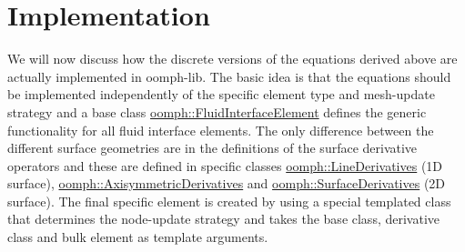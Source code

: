 \hypertarget{index_fs_implementation}{}\section{Implementation}\label{index_fs_implementation}
We will now discuss how the discrete versions of the equations derived above are actually implemented in {\ttfamily oomph-\/lib}. The basic idea is that the equations should be implemented independently of the specific element type and mesh-\/update strategy and a base class \hyperlink{classoomph_1_1FluidInterfaceElement}{oomph\+::\+Fluid\+Interface\+Element} defines the generic functionality for all fluid interface elements. The only difference between the different surface geometries are in the definitions of the surface derivative operators and these are defined in specific classes \hyperlink{classoomph_1_1LineDerivatives}{oomph\+::\+Line\+Derivatives} (1D surface), \hyperlink{classoomph_1_1AxisymmetricDerivatives}{oomph\+::\+Axisymmetric\+Derivatives} and \hyperlink{classoomph_1_1SurfaceDerivatives}{oomph\+::\+Surface\+Derivatives} (2D surface). The final specific element is created by using a special templated class that determines the node-\/update strategy and takes the base class, derivative class and bulk element as template arguments.



